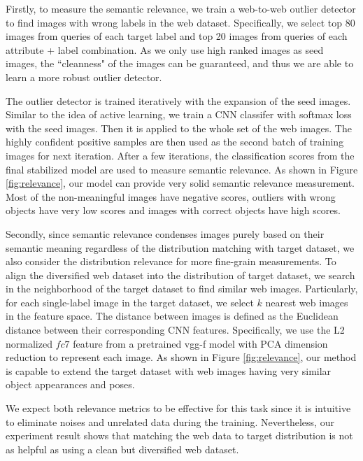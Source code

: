 \documentclass[10pt,twocolumn,letterpaper]{article}
\begin{document}
Firstly, to measure the semantic relevance, we train a web-to-web outlier detector to find images with wrong labels in the web dataset. Specifically, we select top 80 images from queries of each target label and top 20 images from queries of each attribute + label combination. As we only use high ranked images as seed images, the ``cleanness" of the images can be guaranteed, and thus we are able to learn a more robust outlier detector. 

The outlier detector is trained iteratively with the expansion of the seed images. Similar to the idea of active learning, we train a CNN classifer with softmax loss with the seed images. Then it is applied to the whole set of the web images. The highly confident positive samples are then used as the second batch of training images for next iteration. After a few iterations, the classification scores from the final stabilized model are used to measure semantic relevance. As shown in Figure \ref{fig:relevance}, our model can provide very solid semantic relevance measurement. Most of the non-meaningful images have negative scores, outliers with wrong objects have very low scores and images with correct objects have high scores.

Secondly, since semantic relevance condenses images purely based on their semantic meaning regardless of the distribution matching with target dataset, we also consider the distribution relevance for more fine-grain measurements. To align the diversified web dataset into the distribution of target dataset, we search in the neighborhood of the target dataset to find similar web images. Particularly, for each single-label image in the target dataset, we select $k$ nearest web images in the feature space. The distance between images is defined as the Euclidean distance between their corresponding CNN features. Specifically, we use the L2 normalized \(fc7\) feature from a pretrained vgg-f model with PCA dimension reduction to represent each image. As shown in Figure \ref{fig:relevance}, our method is capable to extend the target dataset with web images having very similar object appearances and poses.  



We expect both relevance metrics to be effective for this task since it is intuitive to eliminate noises and unrelated data during the training. Nevertheless, our experiment result shows that matching the web data to target distribution is not as helpful as using a clean but diversified web dataset.
\end{document}
